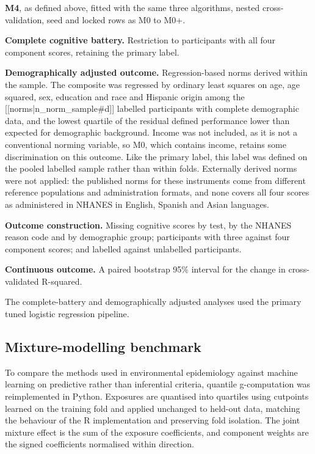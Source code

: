 \documentclass[12pt]{article}
\begin{document}
\textbf{M4}, as defined above, fitted with the same three algorithms, nested cross-validation, seed and locked rows as M0 to M0+.

\textbf{Complete cognitive battery.} Restriction to participants with all four component scores, retaining the primary label.

\textbf{Demographically adjusted outcome.} Regression-based norms derived within the sample. The composite was regressed by ordinary least squares on age, age squared, sex, education and race and Hispanic origin among the [[norms|n_norm_sample#d]] labelled participants with complete demographic data, and the lowest quartile of the residual defined performance lower than expected for demographic background. Income was not included, as it is not a conventional norming variable, so M0, which contains income, retains some discrimination on this outcome. Like the primary label, this label was defined on the pooled labelled sample rather than within folds. Externally derived norms were not applied: the published norms for these instruments come from different reference populations and administration formats, and none covers all four scores as administered in NHANES in English, Spanish and Asian languages.

\textbf{Outcome construction.} Missing cognitive scores by test, by the NHANES reason code and by demographic group; participants with three against four component scores; and labelled against unlabelled participants.

\textbf{Continuous outcome.} A paired bootstrap 95\% interval for the change in cross-validated R-squared.

The complete-battery and demographically adjusted analyses used the primary tuned logistic regression pipeline.

\subsection*{Mixture-modelling benchmark}

To compare the methods used in environmental epidemiology against machine learning on predictive rather than inferential criteria, quantile g-computation was reimplemented in Python. Exposures are quantised into quartiles using cutpoints learned on the training fold and applied unchanged to held-out data, matching the behaviour of the R implementation and preserving fold isolation. The joint mixture effect is the sum of the exposure coefficients, and component weights are the signed coefficients normalised within direction.
\end{document}
